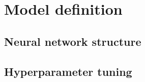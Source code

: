 \section{Model definition}

\subsection{Neural network structure}
\subsection{Hyperparameter tuning}
